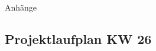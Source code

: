 %
%
%
\begin{appendix}

\newpage

\begin{center}
	\huge{Anhänge}
\end{center}

\normalsize

%

\newpage
\begin{landscape}
	\section{Projektlaufplan KW 26}
	\label{sec:projectplan}
	\scalebox{.75}{
		
		}
\end{landscape}


\end{appendix}
